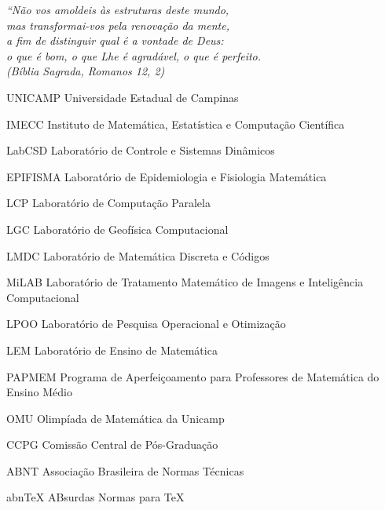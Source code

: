 \documentclass[
	oldfontcommands,
	sumario=abnt-6027-2012,
	12pt,			%
	openright,		%
	oneside,		%
	a4paper,		%
	english,		%
	brazil			%
	]{imecc-unicamp}
\begin{document}
\begin{epigrafe}
    \vspace*{\fill}
    \begin{flushright}
	\textit{``Não vos amoldeis às estruturas deste mundo, \\
	    mas transformai-vos pela renovação da mente, \\
	    a fim de distinguir qual é a vontade de Deus: \\
	    o que é bom, o que Lhe é agradável, o que é perfeito.\\
	    (Bíblia Sagrada, Romanos 12, 2)
	}
    \end{flushright}
\end{epigrafe}

\listoffigures*
\cleardoublepage
\listoftables*
\cleardoublepage
\begin{siglas}
  \item[UNICAMP] Universidade Estadual de Campinas
  \item[IMECC] Instituto de Matemática, Estatística e Computação Científica
  \item[LabCSD] Laboratório de Controle e Sistemas Dinâmicos
  \item[EPIFISMA] Laboratório de Epidemiologia e Fisiologia Matemática
  \item[LCP] Laboratório de Computação Paralela
  \item[LGC] Laboratório de Geofísica Computacional
  \item[LMDC] Laboratório de Matemática Discreta e Códigos
  \item[MiLAB] Laboratório de Tratamento Matemático de Imagens e Inteligência Computacional
  \item[LPOO] Laboratório de Pesquisa Operacional e Otimização
  \item[LEM] Laboratório de Ensino de Matemática
  \item[PAPMEM] Programa de Aperfeiçoamento para Professores de Matemática do Ensino Médio
  \item[OMU] Olimpíada de Matemática da Unicamp
  \item[CCPG] Comissão Central de Pós-Graduação
  \item[ABNT] Associação Brasileira de Normas Técnicas
  \item[abnTeX] ABsurdas Normas para TeX
\end{siglas}
\end{document}
